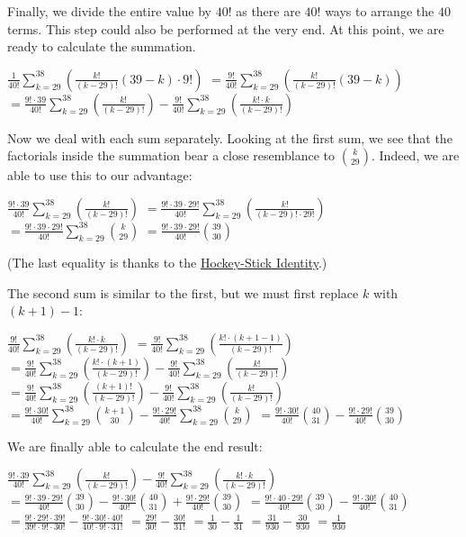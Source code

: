 \begin{enumerate}
 Finally, we divide the entire value by $40!$ as there are $40!$ ways to arrange the $40$ terms. This step could also be performed at the very end. At this point, we are ready to calculate the summation.

 
$\frac{1}{40!}\sum_{k=29}^{38}\left(\frac{k!}{(k-29)!}(39-k)\cdot9!\right)$
$=\frac{9!}{40!}\sum_{k=29}^{38}\left(\frac{k!}{(k-29)!}(39-k)\right)$
$=\frac{9!\cdot39}{40!}\sum_{k=29}^{38}\left(\frac{k!}{(k-29)!}\right)-\frac{9!}{40!}\sum_{k=29}^{38}\left(\frac{k!\cdot k}{(k-29)!}\right)$

 Now we deal with each sum separately. Looking at the first sum, we see that the factorials inside the summation bear a close resemblance to ${k\choose29}$. Indeed, we are able to use this to our advantage:

 $\frac{9!\cdot39}{40!}\sum_{k=29}^{38}\left(\frac{k!}{(k-29)!}\right)$
$=\frac{9!\cdot39\cdot29!}{40!}\sum_{k=29}^{38}\left(\frac{k!}{(k-29)!\cdot29!}\right)$
$=\frac{9!\cdot39\cdot29!}{40!}\sum_{k=29}^{38}{k\choose29}$
$=\frac{9!\cdot39\cdot29!}{40!}{39\choose30}$

 (The last equality is thanks to the \href{https://artofproblemsolving.com/wiki/index.php?title=Hockey-Stick\_Identity}{Hockey-Stick Identity}.)

 The second sum is similar to the first, but we must first replace $k$ with $(k+1)-1$:

 $\frac{9!}{40!}\sum_{k=29}^{38}\left(\frac{k!\cdot k}{(k-29)!}\right)$
$=\frac{9!}{40!}\sum_{k=29}^{38}\left(\frac{k!\cdot(k+1-1)}{(k-29)!}\right)$
$=\frac{9!}{40!}\sum_{k=29}^{38}\left(\frac{k!\cdot(k+1)}{(k-29)!}\right)-\frac{9!}{40!}\sum_{k=29}^{38}\left(\frac{k!}{(k-29)!}\right)$
$=\frac{9!}{40!}\sum_{k=29}^{38}\left(\frac{(k+1)!}{(k-29)!}\right)-\frac{9!}{40!}\sum_{k=29}^{38}\left(\frac{k!}{(k-29)!}\right)$
$=\frac{9!\cdot30!}{40!}\sum_{k=29}^{38}{k+1\choose30}-\frac{9!\cdot29!}{40!}\sum_{k=29}^{38}{k\choose29}$
$=\frac{9!\cdot30!}{40!}{40\choose31}-\frac{9!\cdot29!}{40!}{39\choose30}$

 We are finally able to calculate the end result:

 $\frac{9!\cdot39}{40!}\sum_{k=29}^{38}\left(\frac{k!}{(k-29)!}\right)-\frac{9!}{40!}\sum_{k=29}^{38}\left(\frac{k!\cdot k}{(k-29)!}\right)$
$=\frac{9!\cdot39\cdot29!}{40!}{39\choose30}-\frac{9!\cdot30!}{40!}{40\choose31}+\frac{9!\cdot29!}{40!}{39\choose30}$
$=\frac{9!\cdot40\cdot29!}{40!}{39\choose30}-\frac{9!\cdot30!}{40!}{40\choose31}$
$=\frac{9!\cdot29!\cdot39!}{39!\cdot9!\cdot30!}-\frac{9!\cdot30!\cdot40!}{40!\cdot9!\cdot31!}$
$=\frac{29!}{30!}-\frac{30!}{31!}$
$=\frac{1}{30}-\frac{1}{31}$
$=\frac{31}{930}-\frac{30}{930}$
$=\frac{1}{930}$


\end{enumerate}
